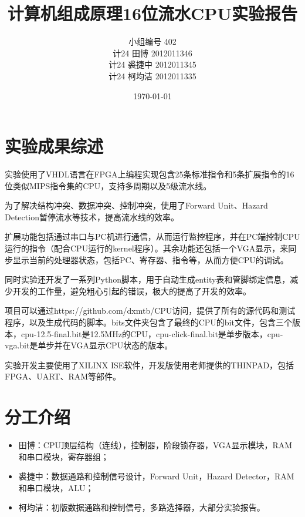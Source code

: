 \documentclass{article}
\title{计算机组成原理16位流水CPU实验报告
} %
\author{
小组编号 402\\
计24 田博 2012011346\\
计24 裘捷中 2012011345\\
计24 柯均洁 2012011335
} %
\date{\today} %
\begin{document}
\maketitle %

\setcounter{tocdepth}{3} %

\tableofcontents %

\section{实验成果综述}

实验使用了VHDL语言在FPGA上编程实现包含25条标准指令和5条扩展指令的16位类似MIPS指令集的CPU，支持多周期以及5级流水线。

为了解决结构冲突、数据冲突、控制冲突，使用了Forward Unit、Hazard Detection暂停流水等技术，提高流水线的效率。

扩展功能包括通过串口与PC机进行通信，从而运行监控程序，并在PC端控制CPU运行的指令（配合CPU运行的kernel程序）。其余功能还包括一个VGA显示，来同步显示当前的处理器状态，包括PC、寄存器、指令等，从而方便CPU的调试。

同时实验还开发了一系列Python脚本，用于自动生成entity表和管脚绑定信息，减少开发的工作量，避免粗心引起的错误，极大的提高了开发的效率。

项目可以通过https://github.com/dxmtb/CPU访问，提供了所有的源代码和测试程序，以及生成代码的脚本。bits文件夹包含了最终的CPU的bit文件，包含三个版本，cpu-12.5-final.bit是12.5MHz的CPU，cpu-click-final.bit是单步版本，cpu-vga.bit是单步并在VGA显示CPU状态的版本。

实验开发主要使用了XILINX ISE软件，开发版使用老师提供的THINPAD，包括FPGA、UART、RAM等部件。

\section{分工介绍} %
\label{sec:分工介绍}

\begin{itemize}
	\item 田博：CPU顶层结构（连线），控制器，阶段锁存器，VGA显示模块，RAM和串口模块，寄存器组；
	\item 裘捷中：数据通路和控制信号设计，Forward Unit，Hazard Detector，RAM和串口模块，ALU；
	\item 柯均洁：初版数据通路和控制信号，多路选择器，大部分实验报告。
\end{itemize}
\end{document}
